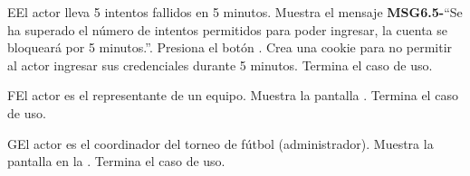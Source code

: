 	\begin{UCtrayectoriaA}{E}{El actor lleva 5 intentos fallidos en 5 minutos.}
		\UCpaso Muestra el mensaje {\bf MSG6.5-}``Se ha superado el número de intentos permitidos para poder ingresar, la cuenta se bloqueará por 5 minutos.''.		
		\UCpaso[\UCactor] Presiona el botón .
		\UCpaso Crea una cookie para no permitir al actor ingresar sus credenciales durante 5 minutos.
		\UCpaso[] Termina el caso de uso.
	\end{UCtrayectoriaA}
	
	\begin{UCtrayectoriaA}{F}{El actor es el representante de un equipo.}
		\UCpaso Muestra la pantalla .
		\UCpaso[] Termina el caso de uso.
	\end{UCtrayectoriaA}
	
	\begin{UCtrayectoriaA}{G}{El actor es el coordinador del torneo de fútbol (administrador).}
		\UCpaso Muestra la pantalla  en la .
		\UCpaso[] Termina el caso de uso.
	\end{UCtrayectoriaA}
